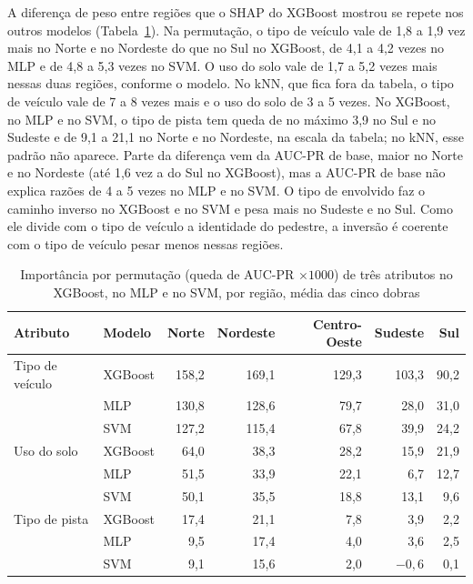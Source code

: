 \documentclass[12pt]{article}
\begin{document}
A diferença de peso entre regiões que o SHAP do XGBoost mostrou se
repete nos outros modelos (Tabela~\ref{tab:pesos}). Na permutação, o
tipo de veículo vale de 1,8 a 1,9 vez mais no Norte e no Nordeste do que
no Sul no XGBoost, de 4,1 a 4,2 vezes no MLP e de 4,8 a 5,3 vezes no
SVM. O uso do solo vale de 1,7 a 5,2 vezes mais nessas duas regiões,
conforme o modelo. No kNN, que fica fora da tabela, o tipo de veículo
vale de 7 a 8 vezes mais e o uso do solo de 3 a 5 vezes. No XGBoost, no MLP e no SVM, o
tipo de pista tem queda de no máximo 3,9 no Sul e no Sudeste e de 9,1 a
21,1 no Norte e no Nordeste, na escala da tabela; no kNN, esse padrão
não aparece. Parte da
diferença vem da AUC-PR de base, maior no Norte e no Nordeste (até 1,6
vez a do Sul no XGBoost), mas a AUC-PR de base não explica razões de
4 a 5 vezes no MLP e no SVM. O tipo de envolvido faz o caminho inverso no XGBoost
e no SVM e pesa mais no Sudeste e no Sul. Como ele divide com o tipo de
veículo a identidade do pedestre, a inversão é coerente com o tipo de
veículo pesar menos nessas regiões.

\begin{table}[H]
\centering
\caption{Importância por permutação (queda de AUC-PR $\times 1000$) de
três atributos no XGBoost, no MLP e no SVM, por região, média das cinco
dobras}
\label{tab:pesos}
\small
\begin{tabular}{llrrrrr}
\toprule
Atributo & Modelo & Norte & Nordeste & Centro-Oeste & Sudeste & Sul \\
\midrule
Tipo de veículo & XGBoost & 158,2 & 169,1 & 129,3 & 103,3 & 90,2 \\
                & MLP     & 130,8 & 128,6 & 79,7  & 28,0  & 31,0 \\
                & SVM     & 127,2 & 115,4 & 67,8  & 39,9  & 24,2 \\
\midrule
Uso do solo     & XGBoost & 64,0  & 38,3  & 28,2  & 15,9  & 21,9 \\
                & MLP     & 51,5  & 33,9  & 22,1  & 6,7   & 12,7 \\
                & SVM     & 50,1  & 35,5  & 18,8  & 13,1  & 9,6  \\
\midrule
Tipo de pista   & XGBoost & 17,4  & 21,1  & 7,8   & 3,9   & 2,2  \\
                & MLP     & 9,5   & 17,4  & 4,0   & 3,6   & 2,5  \\
                & SVM     & 9,1   & 15,6  & 2,0   & $-0{,}6$ & 0,1 \\
\bottomrule
\end{tabular}
\end{table}
\end{document}

